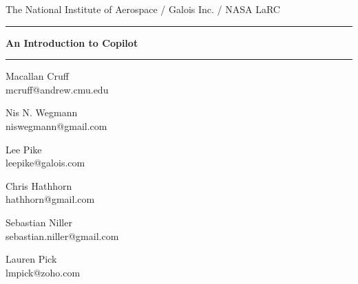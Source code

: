 \documentclass[12pt]{article}
\theoremstyle{example}
\newcommand{\HRule}{\rule{\linewidth}{0.25pt}}
\begin{document}
\thispagestyle{empty}

\begin{center}

The National Institute of Aerospace / Galois Inc. / NASA LaRC

\vspace{0.1cm}

\HRule

\vspace{0.6cm}

{\Huge \bfseries
An Introduction to Copilot
}
\HRule

\vspace{1cm}

\begin{minipage}{0.3\textwidth}
\large
\begin{center}
Macallan Cruff\\
\small{
mcruff@andrew.cmu.edu\\
}
\end{center}
\end{minipage}
\begin{minipage}{0.3\textwidth}
\large
\begin{center}
Nis N. Wegmann\\
\small{
niswegmann@gmail.com\\
}
\end{center}
\end{minipage}

\vspace{1cm}

\begin{minipage}{0.3\textwidth}
\large
\begin{center}
Lee Pike\\
\small{
leepike@galois.com\\
}
\end{center}
\end{minipage}
\begin{minipage}{0.3\textwidth}
\large
\begin{center}
Chris Hathhorn \\
\small{
hathhorn@gmail.com\\
}
\end{center}
\end{minipage}
\vspace{1cm}


\begin{minipage}{0.3\textwidth}
\large
\begin{center}
Sebastian Niller\\
\small{
sebastian.niller@gmail.com\\
}
\end{center}
\end{minipage}
\begin{minipage}{0.3\textwidth}
\large
\begin{center}
Lauren Pick\\
\small{
lmpick@zoho.com\\
}
\end{center}
\end{minipage}
\vspace{1cm}



\end{center}
\end{document}
